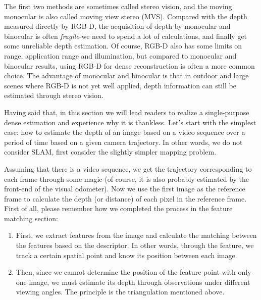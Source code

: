 The first two methods are sometimes called stereo vision, and the moving monocular is also called moving view stereo (MVS). Compared with the depth measured directly by RGB-D, the acquisition of depth by monocular and binocular is often \textit{fragile}-we need to spend a lot of calculations, and finally get some unreliable depth estimation. Of course, RGB-D also has some limits on range, application range and illumination, but compared to monocular and binocular results, using RGB-D for dense reconstruction is often a more common choice. The advantage of monocular and binocular is that in outdoor and large scenes where RGB-D is not yet well applied, depth information can still be estimated through stereo vision.

Having said that, in this section we will lead readers to realize a single-purpose dense estimation and experience why it is thankless. Let’s start with the simplest case: how to estimate the depth of an image based on a video sequence over a period of time based on a given camera trajectory. In other words, we do not consider SLAM, first consider the slightly simpler mapping problem.

Assuming that there is a video sequence, we get the trajectory corresponding to each frame through some magic (of course, it is also probably estimated by the front-end of the visual odometer). Now we use the first image as the reference frame to calculate the depth (or distance) of each pixel in the reference frame. First of all, please remember how we completed the process in the feature matching section:

\begin{enumerate}
	\item First, we extract features from the image and calculate the matching between the features based on the descriptor. In other words, through the feature, we track a certain spatial point and know its position between each image.
	\item Then, since we cannot determine the position of the feature point with only one image, we must estimate its depth through observations under different viewing angles. The principle is the triangulation mentioned above.
\end{enumerate}

